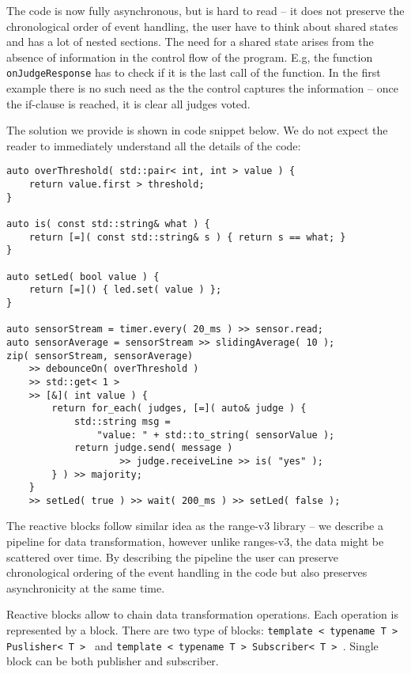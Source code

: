 The code is now fully asynchronous, but is hard to read -- it does not preserve
the chronological order of event handling, the user have to think about shared
states and has a lot of nested sections. The need for a shared state arises from
the absence of information in the control flow of the program. E.g, the function
\texttt{onJudgeResponse} has to check if it is the last call of the function. In
the first example there is no such need as the the control captures the
information -- once the if-clause is reached, it is clear all judges voted.

The solution we provide is shown in code snippet below. We do not expect the
reader to immediately understand all the details of the code:

\begin{verbatim}
auto overThreshold( std::pair< int, int > value ) {
    return value.first > threshold;
}

auto is( const std::string& what ) {
    return [=]( const std::string& s ) { return s == what; }
}

auto setLed( bool value ) {
    return [=]() { led.set( value ) };
}

auto sensorStream = timer.every( 20_ms ) >> sensor.read;
auto sensorAverage = sensorStream >> slidingAverage( 10 );
zip( sensorStream, sensorAverage)
    >> debounceOn( overThreshold )
    >> std::get< 1 >
    >> [&]( int value ) {
        return for_each( judges, [=]( auto& judge ) {
            std::string msg =
                "value: " + std::to_string( sensorValue );
            return judge.send( message )
                    >> judge.receiveLine >> is( "yes" );
        } ) >> majority;
    }
    >> setLed( true ) >> wait( 200_ms ) >> setLed( false );
\end{verbatim}

The reactive blocks follow similar idea as the range-v3 library -- we describe a
pipeline for data transformation, however unlike ranges-v3, the data might be
scattered over time. By describing the pipeline the user can preserve
chronological ordering of the event handling in the code but also preserves
asynchronicity at the same time.

Reactive blocks allow to chain data transformation operations. Each operation is
represented by a block. There are two type of blocks:
\texttt{template < typename T > Puslisher< T > } and
\texttt{template < typename T > Subscriber< T > }. Single
block can be both publisher and subscriber.

